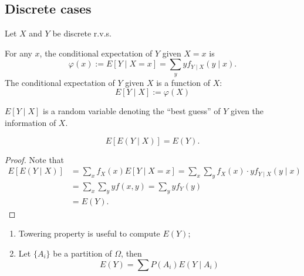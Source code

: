 \documentclass[11pt,singlecolumn, openany, citestyle=authoryear]{elegantbook}
\begin{document}
\begin{CJK}{UTF8}{gbsn}
\subsection{Discrete cases}
Let $X$ and $Y$ be discrete r.v.s.
\begin{definition}
    For any $x$, the conditional expectation of $Y$ given $X=x$ is 
    \begin{equation}
        \varphi(x):=E[Y\mid X= x]=\sum_y y f_{Y\mid X}(y\mid x).
    \end{equation}
    The conditional expectation of $Y$ given $X$ is a function of $X$:
    \begin{equation}
        E[Y\mid X]:= \varphi(X)
    \end{equation}
\end{definition}
\begin{remark}
    $E[Y\mid X]$ is a random variable denoting the ``best guess'' of $Y$ given the 
    information of $X$.
\end{remark}

\begin{proposition}
    $$
    E[E(Y\mid X)] = E(Y).
    $$
\end{proposition}
\begin{proof}
    Note that 
    \begin{align*}
    E[E(Y\mid X)] &= \sum_x f_X(x) E[Y\mid X = x]= \sum_x \sum_y f_X(x)\cdot y 
    f_{Y\mid X}(y\mid x)\\
    &= \sum_x\sum_y yf(x,y)= \sum_y yf_Y(y)\\
    &= E(Y). 
    \end{align*}
\end{proof}
\begin{remark}
    \begin{enumerate}
        \item Towering property is useful to compute $E(Y)$;
        \item Let $\{A_i\}$ be a partition of $\Omega$, then 
        $$
        E(Y)=\sum P(A_i) E(Y\mid A_i)
        $$
    \end{enumerate}
\end{remark}


\end{CJK}
\end{document}
